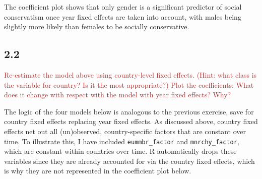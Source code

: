 \documentclass[
]{article}
\begin{document}
The coefficient plot shows that only gender is a significant predictor
of social conservatism once year fixed effects are taken into account,
with males being slightly more likely than females to be socially
conservative.

\hypertarget{section-6}{%
\subsection{2.2}\label{section-6}}

\textcolor{brown}{Re-estimate the model above using country-level fixed effects. (Hint: what class is the variable for country? Is it the most appropriate?) Plot the coefficients: What does it change with respect with the model with year fixed effects? Why?}

The logic of the four models below is analogous to the previous
exercise, save for country fixed effects replacing year fixed effects.
As discussed above, country fixed effects net out all (un)observed,
country-specific factors that are constant over time. To illustrate
this, I have included \texttt{eummbr\_factor} and
\texttt{mnrchy\_factor}, which are constant within countries over time.
R automatically drops these variables since they are already accounted
for via the country fixed effects, which is why they are not represented
in the coefficient plot below.
\end{document}
